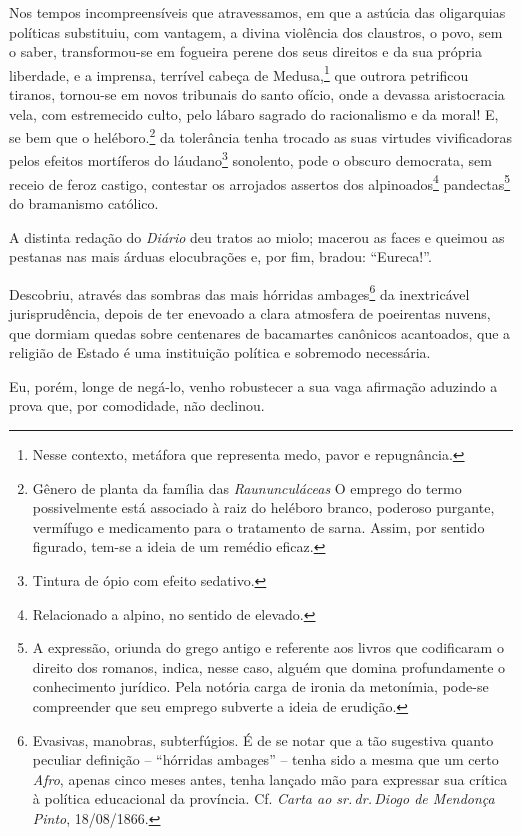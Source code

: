 Nos tempos incompreensíveis que atravessamos, em que a astúcia das
oligarquias políticas substituiu, com vantagem, a divina violência dos
claustros, o povo, sem o saber, transformou-se em fogueira perene dos
seus direitos e da sua própria liberdade, e a imprensa, terrível cabeça
de Medusa,\footnote{Nesse contexto, metáfora que representa medo,
  pavor e repugnância.} que outrora petrificou tiranos, tornou-se em
novos tribunais do santo ofício, onde a devassa aristocracia vela, com
estremecido culto, pelo lábaro sagrado do racionalismo e da moral! E, se
bem que o heléboro.\footnote{Gênero de planta da família das
  \emph{Raununculáceas} O emprego do termo possivelmente está associado
  à raiz do heléboro branco, poderoso purgante, vermífugo e medicamento
  para o tratamento de sarna. Assim, por sentido figurado, tem-se a
  ideia de um remédio eficaz.} da tolerância tenha trocado as suas
virtudes vivificadoras pelos efeitos mortíferos do láudano\footnote{
  Tintura de ópio com efeito sedativo.} sonolento, pode o obscuro
democrata, sem receio de feroz castigo, contestar os arrojados assertos
dos alpinoados\footnote{Relacionado a alpino, no sentido de elevado.}
pandectas\footnote{A expressão, oriunda do grego antigo e referente
  aos livros que codificaram o direito dos romanos, indica, nesse caso,
  alguém que domina profundamente o conhecimento jurídico. Pela notória
  carga de ironia da metonímia, pode-se compreender que seu emprego
  subverte a ideia de erudição.} do bramanismo católico.

A distinta redação do \emph{Diário} deu tratos ao miolo; macerou as
faces e queimou as pestanas nas mais árduas elocubrações e, por fim,
bradou: ``Eureca!''.

Descobriu, através das sombras das mais hórridas ambages\footnote{
  Evasivas, manobras, subterfúgios. É de se notar que a tão sugestiva
  quanto peculiar definição -- ``hórridas ambages'' -- tenha sido a mesma
  que um certo \emph{Afro}, apenas cinco meses antes, tenha lançado mão
  para expressar sua crítica à política educacional da província. Cf.
  \emph{Carta ao sr.\,dr.\,Diogo de Mendonça Pinto}, 18/08/1866.} da
inextricável jurisprudência, depois de ter enevoado a clara atmosfera de
poeirentas nuvens, que dormiam quedas sobre centenares de bacamartes
canônicos acantoados, que a religião de Estado é uma instituição
política e sobremodo necessária.

Eu, porém, longe de negá-lo, venho robustecer a sua vaga afirmação
aduzindo a prova que, por comodidade, não declinou.

